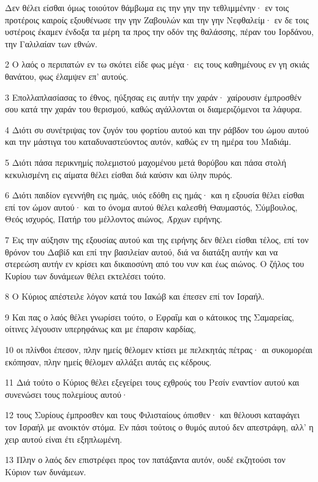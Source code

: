 \par Δεν θέλει είσθαι όμως τοιούτον θάμβωμα εις την γην την τεθλιμμένην· εν τοις προτέροις καιροίς εξουθένωσε την γην Ζαβουλών και την γην Νεφθαλείμ· εν δε τοις υστέροις έκαμεν ένδοξα τα μέρη τα προς την οδόν της θαλάσσης, πέραν του Ιορδάνου, την Γαλιλαίαν των εθνών.
\par 2 Ο λαός ο περιπατών εν τω σκότει είδε φως μέγα· εις τους καθημένους εν γη σκιάς θανάτου, φως έλαμψεν επ' αυτούς.
\par 3 Επολλαπλασίασας το έθνος, ηύξησας εις αυτήν την χαράν· χαίρουσιν έμπροσθέν σου κατά την χαράν του θερισμού, καθώς αγάλλονται οι διαμεριζόμενοι τα λάφυρα.
\par 4 Διότι συ συνέτριψας τον ζυγόν του φορτίου αυτού και την ράβδον του ώμου αυτού και την μάστιγα του καταδυναστεύοντος αυτόν, καθώς εν τη ημέρα του Μαδιάμ.
\par 5 Διότι πάσα περικνημίς πολεμιστού μαχομένου μετά θορύβου και πάσα στολή κεκυλισμένη εις αίματα θέλει είσθαι διά καύσιν και ύλην πυρός.
\par 6 Διότι παιδίον εγεννήθη εις ημάς, υιός εδόθη εις ημάς· και η εξουσία θέλει είσθαι επί τον ώμον αυτού· και το όνομα αυτού θέλει καλεσθή Θαυμαστός, Σύμβουλος, Θεός ισχυρός, Πατήρ του μέλλοντος αιώνος, Άρχων ειρήνης.
\par 7 Εις την αύξησιν της εξουσίας αυτού και της ειρήνης δεν θέλει είσθαι τέλος, επί τον θρόνον του Δαβίδ και επί την βασιλείαν αυτού, διά να διατάξη αυτήν και να στερεώση αυτήν εν κρίσει και δικαιοσύνη από του νυν και έως αιώνος. Ο ζήλος του Κυρίου των δυνάμεων θέλει εκτελέσει τούτο.
\par 8 Ο Κύριος απέστειλε λόγον κατά του Ιακώβ και έπεσεν επί τον Ισραήλ.
\par 9 Και πας ο λαός θέλει γνωρίσει τούτο, ο Εφραΐμ και ο κάτοικος της Σαμαρείας, οίτινες λέγουσιν υπερηφάνως και με έπαρσιν καρδίας,
\par 10 οι πλίνθοι έπεσον, πλην ημείς θέλομεν κτίσει με πελεκητάς πέτρας· αι συκομορέαι εκόπησαν, πλην ημείς θέλομεν αλλάξει αυτάς εις κέδρους.
\par 11 Διά τούτο ο Κύριος θέλει εξεγείρει τους εχθρούς του Ρεσίν εναντίον αυτού και συνενώσει τους πολεμίους αυτού·
\par 12 τους Συρίους έμπροσθεν και τους Φιλισταίους όπισθεν· και θέλουσι καταφάγει τον Ισραήλ με ανοικτόν στόμα. Εν πάσι τούτοις ο θυμός αυτού δεν απεστράφη, αλλ' η χειρ αυτού είναι έτι εξηπλωμένη.
\par 13 Πλην ο λαός δεν επιστρέφει προς τον πατάξαντα αυτόν, ουδέ εκζητούσι τον Κύριον των δυνάμεων.
